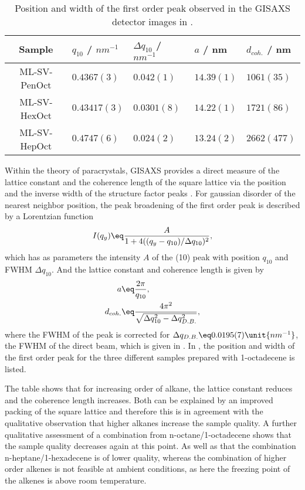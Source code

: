 \documentclass[\main/dresen_thesis.tex]{subfiles}
\begin{document}
  \begin{table}[tb]
    \centering
    \caption{\label{tab:monolayers:solventProperties:GisaxsLatticeParams}Position and width of the first order peak observed in the GISAXS detector images in .}
    \begin{tabular}{ c || l | l || l | l }
      Sample  & $q_{10}$ / $\unit{nm^{-1}}$ & $\Delta q_{10}$ / $nm^{-1}$ & $a$ / nm & $d_{coh.}$ / nm \\
      \hline
      ML-SV-PenOct
        & $0.4367(3)$
        & $0.042(1)$
        & $14.39(1)$
        & $1061(35)$\\
      ML-SV-HexOct
        & $0.43417(3)$
        & $0.0301(8)$
        & $14.22(1)$
        & $1721(86)$\\
      ML-SV-HepOct
        & $0.4747(6)$
        & $0.024(2)$
        & $13.24(2)$
        & $2662(477)$\\
      \hline
    \end{tabular}
  \end{table}

  Within the theory of paracrystals, GISAXS provides a direct measure of the lattice constant and the coherence length of the square lattice via the position and the inverse width of the structure factor peaks \cite{Renaud_2009_Probi}.
  For gaussian disorder of the nearest neighbor position, the peak broadening of the first order peak is described by a Lorentzian function
  \begin{align}
    I(q_y) \eq \frac{A} {1 + 4((q_y - q_{10})/\Delta q_{10})^2},
  \end{align}
  which has as parameters the intensity $A$ of the (10) peak with position $q_{10}$ and FWHM $\Delta q_{10}$.
  And the lattice constant and coherence length is given by
  \begin{align}
    a &\eq \frac{2 \pi}{q_{10}}, \\
    d_{coh.} &\eq \frac{4 \pi^2}{\sqrt{ \Delta q_{10}^2 - \Delta q_{D.B.}^2 }},
  \end{align}
  where the FWHM of the peak is corrected for $\Delta q_{D.B.} \eq 0.0195(7) \unit{nm^{-1}}$, the FWHM of the direct beam, which is given in . In , the position and width of the first order peak for the three different samples prepared with 1-octadecene is listed.

  The table shows that for increasing order of alkane, the lattice constant reduces and the coherence length increases.
  Both can be explained by an improved packing of the square lattice and therefore this is in agreement with the qualitative observation that higher alkanes increase the sample quality.
  A further qualitative assessment of a combination from n-octane/1-octadecene shows that the sample quality decreases again at this point.
  As well as that the combination n-heptane/1-hexadecene is of lower quality, whereas the combination of higher order alkenes is not feasible at ambient conditions, as here the freezing point of the alkenes is above room temperature.
\end{document}
